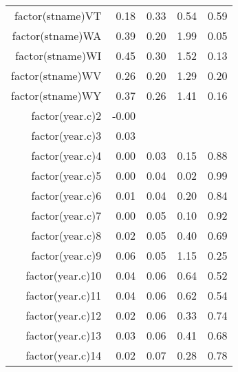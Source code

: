 \begin{table}[ht]
\begin{tabular}{rrrrr}
  factor(stname)VT & 0.18 & 0.33 & 0.54 & 0.59 \\ 
  factor(stname)WA & 0.39 & 0.20 & 1.99 & 0.05 \\ 
  factor(stname)WI & 0.45 & 0.30 & 1.52 & 0.13 \\ 
  factor(stname)WV & 0.26 & 0.20 & 1.29 & 0.20 \\ 
  factor(stname)WY & 0.37 & 0.26 & 1.41 & 0.16 \\ 
  factor(year.c)2 & -0.00 &  &  &  \\ 
  factor(year.c)3 & 0.03 &  &  &  \\ 
  factor(year.c)4 & 0.00 & 0.03 & 0.15 & 0.88 \\ 
  factor(year.c)5 & 0.00 & 0.04 & 0.02 & 0.99 \\ 
  factor(year.c)6 & 0.01 & 0.04 & 0.20 & 0.84 \\ 
  factor(year.c)7 & 0.00 & 0.05 & 0.10 & 0.92 \\ 
  factor(year.c)8 & 0.02 & 0.05 & 0.40 & 0.69 \\ 
  factor(year.c)9 & 0.06 & 0.05 & 1.15 & 0.25 \\ 
  factor(year.c)10 & 0.04 & 0.06 & 0.64 & 0.52 \\ 
  factor(year.c)11 & 0.04 & 0.06 & 0.62 & 0.54 \\ 
  factor(year.c)12 & 0.02 & 0.06 & 0.33 & 0.74 \\ 
  factor(year.c)13 & 0.03 & 0.06 & 0.41 & 0.68 \\ 
  factor(year.c)14 & 0.02 & 0.07 & 0.28 & 0.78 \\ 
   \hline
\end{tabular}
\end{table}
